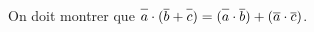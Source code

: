 \documentclass[]{amsart}
\begin{document}
On doit montrer que $\overline{\vphantom ba} \cdot(\overline b + \overline{\vphantom bc}) =
(\overline{\vphantom ba} \cdot \overline
b)+(\overline a \cdot \overline c)$.
\end{document}
